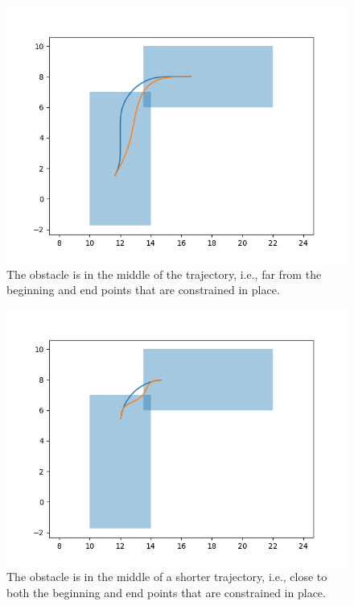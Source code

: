 \begin{figure}
    \centering
    \includegraphics[width=\linewidth]{figs/mid_0_14.png}
    \caption{The obstacle is in the middle of the trajectory, i.e., far from the beginning and end points that are constrained in place.}
    \label{fig:obstacle_mid}
\end{figure}

\begin{figure}
    \centering
    \includegraphics[width=\linewidth]{figs/mid_short_0_39.png}
    \caption{The obstacle is in the middle of a shorter trajectory, i.e., close to both the beginning and end points that are constrained in place.}
    \label{fig:obstacle_mid_short}
\end{figure}

